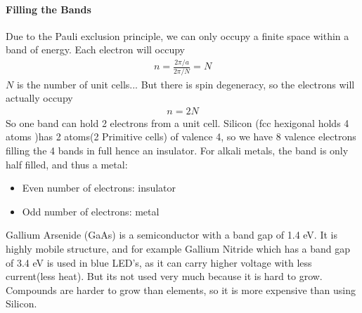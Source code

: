 \documentclass[../main.tex]{subfiles}
\begin{document}
\paragraph*{Filling the Bands} Due to the Pauli exclusion principle, we can only occupy a finite
space within a band of energy. Each electron will occupy
\begin{align*}
    n = \frac{2\pi/a}{2\pi/N} = N
\end{align*}
$N$ is the number of unit cells... But there is spin degeneracy, so the electrons will actually occupy
\begin{align*}
    n = 2N
\end{align*}
So one band can hold 2 electrons from a unit cell. Silicon (fcc hexigonal holds 4 atoms )has 2 atoms(2 Primitive cells)
of valence 4, so we have 8 valence electrons filling the 4 bands in full hence an insulator. 
For alkali metals, the band is only half filled, and thus a metal:
\begin{itemize}
    \item Even number of electrons: insulator
    \item Odd number of electrons: metal
\end{itemize}
Gallium Arsenide (GaAs) is a semiconductor with a band gap of 1.4 eV. It is highly mobile structure,
and for example Gallium Nitride which has a band gap of 3.4 eV is used in blue LED's, as it can
carry higher voltage with less current(less heat). But its not used very much because it is hard to
grow. Compounds are harder to grow than elements, so it is more expensive than using Silicon. 
\end{document}
